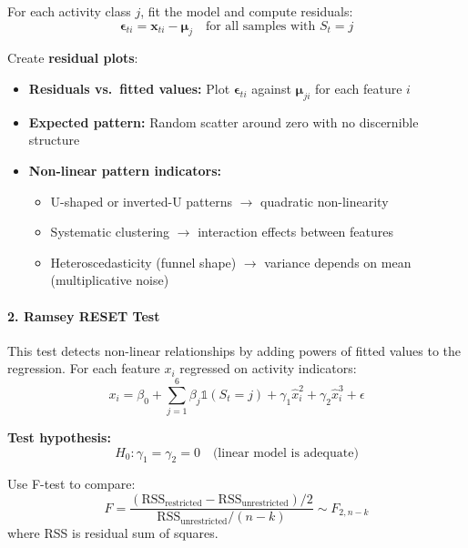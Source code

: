 \documentclass[11pt,a4paper]{article}
\newcommand{\bx}{\mathbf{x}}
\newcommand{\bmu}{\boldsymbol{\mu}}
\newcommand{\bepsilon}{\boldsymbol{\epsilon}}
\begin{document}
For each activity class $j$, fit the model and compute residuals:
\begin{equation}
\bepsilon_{ti} = \bx_{ti} - \bmu_j \quad \text{for all samples with } S_t = j
\end{equation}

Create \textbf{residual plots}:
\begin{itemize}[leftmargin=*]
    \item \textbf{Residuals vs.\ fitted values:} Plot $\bepsilon_{ti}$ against $\bmu_{ji}$ for each feature $i$
    \item \textbf{Expected pattern:} Random scatter around zero with no discernible structure
    \item \textbf{Non-linear pattern indicators:}
    \begin{itemize}
        \item U-shaped or inverted-U patterns $\rightarrow$ quadratic non-linearity
        \item Systematic clustering $\rightarrow$ interaction effects between features
        \item Heteroscedasticity (funnel shape) $\rightarrow$ variance depends on mean (multiplicative noise)
    \end{itemize}
\end{itemize}

\paragraph{2. Ramsey RESET Test}

This test detects non-linear relationships by adding powers of fitted values to the regression. For each feature $x_i$ regressed on activity indicators:
\begin{equation}
x_i = \beta_0 + \sum_{j=1}^{6} \beta_j \mathbb{1}(S_t = j) + \gamma_1 \hat{x}_i^2 + \gamma_2 \hat{x}_i^3 + \epsilon
\end{equation}

\textbf{Test hypothesis:}
\begin{equation}
H_0: \gamma_1 = \gamma_2 = 0 \quad \text{(linear model is adequate)}
\end{equation}

Use F-test to compare:
\begin{equation}
F = \frac{(\text{RSS}_{\text{restricted}} - \text{RSS}_{\text{unrestricted}})/2}{\text{RSS}_{\text{unrestricted}}/(n-k)} \sim F_{2, n-k}
\end{equation}
where RSS is residual sum of squares.
\end{document}

